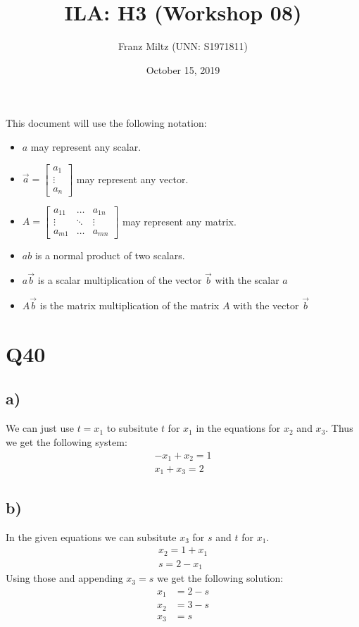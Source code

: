 \documentclass{article}
\title{ILA: H3 (Workshop 08)}
\author{Franz Miltz (UNN: S1971811)}
\date{October 15, 2019}
\begin{document}
\maketitle
This document will use the following notation:
\begin{itemize}
    \item $a$ may represent any scalar.
    \item $\vec{a}=\begin{bmatrix}
        a_1\\
        \vdots\\
        a_n
    \end{bmatrix}$ may represent any vector.
    \item $A=\begin{bmatrix}
        a_{11} &\dots &a_{1n}\\
        \vdots &\ddots &\vdots\\
        a_{m1} &\dots &a_{mn}
    \end{bmatrix}$ may represent any matrix.
    \item $ab$ is a normal product of two scalars.
    \item $a\vec{b}$ is a scalar multiplication of the vector $\vec{b}$ with the scalar $a$
    \item $A\vec b$ is the matrix multiplication of the matrix $A$ with the vector $\vec b$
\end{itemize}
\section*{Q40}
\subsection*{a)}
We can just use $t=x_1$ to subsitute $t$ for $x_1$ in the equations for $x_2$ and $x_3$. Thus we get the following system:
\begin{align*}
    -x_1+x_2=1\\
    x_1+x_3=2 
\end{align*}
\subsection*{b)}
In the given equations we can subsitute $x_3$ for $s$ and $t$ for $x_1$.
\begin{align*}
    x_2 = 1 + x_1\\
    s = 2 - x_1
\end{align*}
Using those and appending $x_3=s$ we get the following solution:
\begin{align*}
    x_1 &= 2-s\\ 
    x_2 &= 3-s\\ 
    x_3 &= s
\end{align*}
\end{document}
